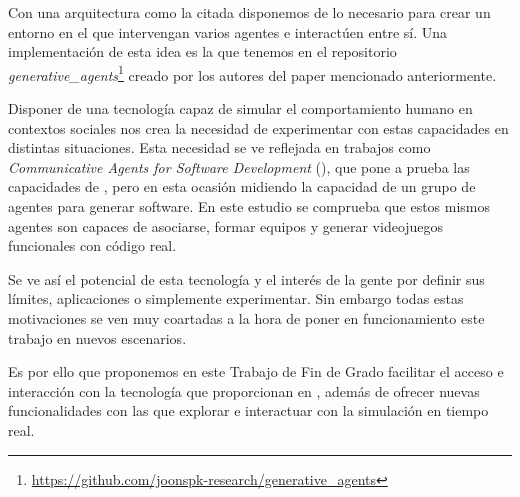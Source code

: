 Con una arquitectura como la citada disponemos de lo necesario para crear un entorno en el que intervengan varios agentes e interactúen entre sí. Una implementación de esta idea es la que tenemos en el repositorio {\textit{generative\_agents}}\footnote{\url{https://github.com/joonspk-research/generative_agents}} creado por los autores del paper mencionado anteriormente.

Disponer de una tecnología capaz de simular el comportamiento humano en contextos sociales nos crea la necesidad de experimentar con estas capacidades en distintas situaciones. Esta necesidad se ve reflejada en trabajos como \textit{Communicative Agents for Software Development} (\cite{qian2023communicative}), que pone a prueba las capacidades de \ga, pero en esta ocasión midiendo la capacidad de un grupo de agentes para generar software. En este estudio se comprueba que estos mismos agentes son capaces de asociarse, formar equipos y generar videojuegos funcionales con código real.

Se ve así el potencial de esta tecnología y el interés de la gente por definir sus límites, aplicaciones o simplemente experimentar.
Sin embargo todas estas motivaciones se ven muy coartadas a la hora de poner en funcionamiento este trabajo en nuevos escenarios.

Es por ello que proponemos en este Trabajo de Fin de Grado facilitar el acceso e interacción con la tecnología que proporcionan en \ga, además de ofrecer nuevas funcionalidades con las que explorar e interactuar con la simulación en tiempo real.

